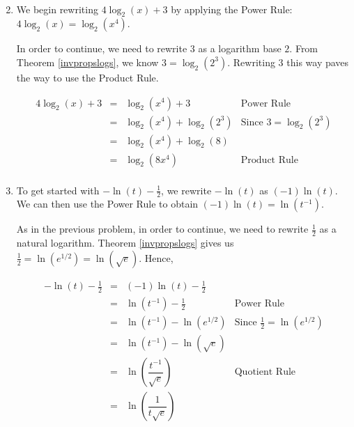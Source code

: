 \documentclass{ximera}
\begin{document}
\begin{example}
\begin{enumerate}
\[\begin{array}{rclr}
                            
\end{array}\]
\setlength{\extrarowheight}{2pt}

\item  We begin rewriting $4\log_{2}(x) + 3$ by applying the Power Rule:  $4\log_{2}(x) = \log_{2}\left(x^4\right)$.

In order to continue, we need to rewrite $3$ as a logarithm base $2$.  From Theorem \ref{invpropslogs}, we know $3 = \log_{2}\left(2^3\right)$.  Rewriting $3$ this way paves the way to use the Product Rule.

\setlength{\extrarowheight}{4pt}
\[ \begin{array}{rclr}

4\log_{2}(x) + 3 & = & \log_{2}\left(x^4\right) + 3  & \mbox{Power Rule} \\ 
                             & = & \log_{2}\left(x^4\right) + \log_{2}\left(2^3\right)& \mbox{Since $3 = \log_{2}\left(2^3\right)$} \\
                             & = & \log_{2}\left(x^4\right) + \log_{2}(8)& \\
                             & = & \log_{2}\left( 8x^4\right) & \mbox{Product Rule} \\
                             
                            
\end{array}\]
\setlength{\extrarowheight}{2pt}

\item To get started with $-\ln(t) - \frac{1}{2}$, we rewrite  $-\ln(t)$ as $(-1) \ln(t)$.  We can then use the Power Rule to obtain $(-1)\ln(t) = \ln\left(t^{-1}\right)$.

As in the previous problem, in order to continue, we need to rewrite $\frac{1}{2}$ as a natural logarithm. Theorem \ref{invpropslogs} gives us $\frac{1}{2} = \ln\left(e^{1/2}\right) = \ln\left(\sqrt{e}\right)$.  Hence,

\setlength{\extrarowheight}{6pt}
\[ \begin{array}{rclr}

-\ln(t) - \frac{1}{2} & = & (-1)\ln(t) - \frac{1}{2}  &  \\ 
                             & = & \ln\left(t^{-1}\right) - \frac{1}{2} & \mbox{Power Rule} \\
                             & = & \ln\left(t^{-1}\right) - \ln\left(e^{1/2}\right)& \mbox{Since $\frac{1}{2} = \ln\left(e^{1/2}\right)$} \\
                             & = & \ln\left(t^{-1}\right) - \ln\left(\sqrt{e} \right)& \\ [6pt]
                             & = & \ln\left(\dfrac{t^{-1}}{\sqrt{e}}\right) & \mbox{Quotient Rule} \\ [10pt]
                             & = & \ln\left(\dfrac{1}{t\sqrt{e}}\right) &
\end{array}\]
\setlength{\extrarowheight}{2pt}


\end{enumerate}
\end{example}
\end{document}
